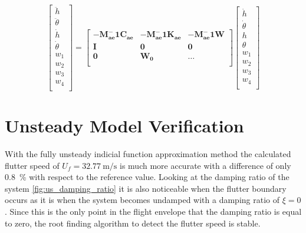 \begin{equation}
    \label{eq:us}
    \begin{bmatrix}
        \ddot{h} \\
        \ddot{\theta} \\
        \dot{h} \\
        \dot{\theta} \\
        w_1 \\
        w_2 \\
        w_3 \\
        w_4 \\
    \end{bmatrix} =
    \begin{bmatrix}
        \bm{-M_{ae}^-1 C_{ae}} &
        \bm{-M_{ae}^-1 K_{ae}} &
        \bm{-M_{ae}^-1 W} \\
        \bm{I} & \bm{0} & \bm{0} \\
        \bm{0} & \bm{W_0} & \dots\\
    \end{bmatrix}
    \begin{bmatrix}
        \dot{h} \\
        \dot{\theta} \\
        h \\
        \theta \\
        w_1 \\
        w_2 \\
        w_3 \\
        w_4 \\
    \end{bmatrix}
\end{equation}

\section{Unsteady Model Verification}
With the fully unsteady indicial function approximation method the calculated
flutter speed of $U_f = \SI{32.77}{\meter\per\second}$ is much more accurate
with a difference of only \SI{0.8}{\percent} with respect to the reference
value. Looking at the damping ratio of the system \cref{fig:us_damping_ratio}
it is also noticeable when the flutter boundary occurs as it is when the system
becomes undamped with a damping ratio of $\xi = 0$
\autocite[s.7]{andrianneLectureDynamicAeroelasticity}. Since this is the only
point in the flight envelope that the damping ratio is equal to zero, the root
finding algorithm to detect the flutter speed is stable.

